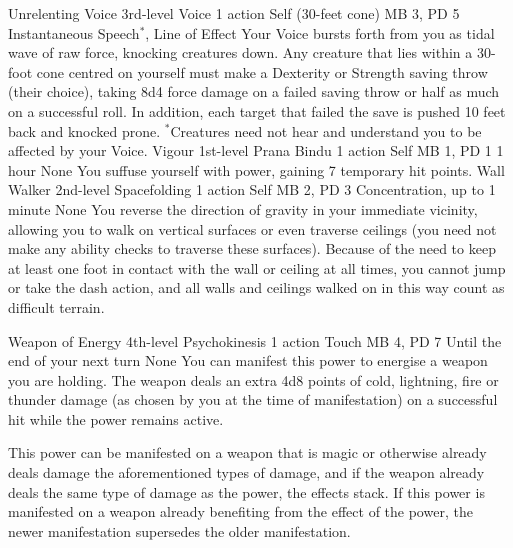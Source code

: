 \DndPowerHeader%
    {Unrelenting Voice\label{pwr:unrelenting_voice}}
    {3rd-level Voice}
    {1 action}
    {Self (30-feet cone)}
    {MB 3, PD 5}
    {Instantaneous}
    {Speech$^*$, Line of Effect}
Your Voice bursts forth from you as tidal
wave of raw force, knocking creatures down. Any creature that
lies within a 30-foot cone centred on yourself must make a
Dexterity or Strength saving throw (their choice), taking
8d4 force damage on a failed saving throw or half as much
on a successful roll. In addition, each target that failed
the save is pushed 10 feet back and knocked prone.
$^*$Creatures need not hear and understand you to be
affected by your Voice.
\DndPowerHeader%
    {Vigour\label{pwr:vigour}}
    {1st-level Prana Bindu}
    {1 action}
    {Self}
    {MB 1, PD 1}
    {1 hour}
    {None}
You suffuse yourself with power, gaining
7 temporary hit points.
\DndPowerHeader%
    {Wall Walker\label{pwr:wall_walker}}
    {2nd-level Spacefolding}
    {1 action}
    {Self}
    {MB 2, PD 3}
    {Concentration, up to 1 minute}
    {None}
You reverse the direction of gravity in your
immediate vicinity, allowing you to walk on vertical surfaces
or even traverse ceilings (you need not make any ability checks
to traverse these surfaces). Because of the need to keep at
least one foot in contact with the wall or ceiling at all
times, you cannot jump or take the dash action, and all walls
and ceilings walked on in this way count as difficult terrain.

\DndPowerHeader%
    {Weapon of Energy\label{pwr:weapon_of_energy}}
    {4th-level Psychokinesis}
    {1 action}
    {Touch}
    {MB 4, PD 7}
    {Until the end of your next turn}
    {None}
You can manifest this power to energise a
weapon you are holding. The weapon deals an extra 4d8 points
of cold, lightning, fire or thunder damage (as chosen by you
at the time of manifestation) on a successful hit
while the power remains active.

This power can be manifested on a weapon that is magic or
otherwise already deals damage the aforementioned types of
damage, and if the weapon already deals the same type of damage
as the power, the effects stack. If this power is manifested
on a weapon already benefiting from the effect of the power,
the newer manifestation supersedes the older manifestation.

